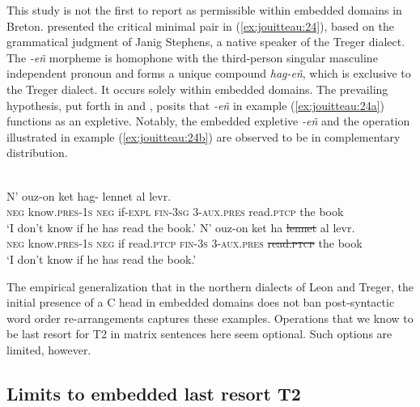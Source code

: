 \documentclass[output=paper,colorlinks,citecolor=brown]{langscibook}
\begin{document}
This study is not the first to report  as permissible within embedded domains in Breton. \citet{mj:Rivero1999} presented the critical minimal pair in (\ref{ex:jouitteau:24}), based on the grammatical judgment of Janig Stephens, a native speaker of the Treger dialect. The \textit{-eñ} morpheme is homophone with the third-person singular masculine independent pronoun and forms a unique compound \textit{hag-eñ}, which is exclusive to the Treger dialect. It occurs solely within embedded domains. The prevailing hypothesis, put forth in \citet[318]{mj:Lambert1998} and \citet[81--82]{mj:Rivero1999}, posits that \textit{-eñ} in example (\ref{ex:jouitteau:24a}) functions as an expletive. Notably, the embedded expletive \textit{-eñ} and the  operation illustrated in example (\ref{ex:jouitteau:24b}) are observed to be in complementary distribution. 


\ea \label{ex:jouitteau:24} \\
\ea \label{ex:jouitteau:24a}
    \gll  N'   ouz-on              ket  hag-  {}        {}         lennet     al   levr.  \\
     \textsc{neg} know\textsc{.pres}{}-\textsc{1s} \textsc{neg} if-\textsc{expl}   \textsc{fin}{}-\textsc{3sg} 3\textsc{{}-aux.pres} read\textsc{.ptcp} the book      \\
    \glt ‘I don't know if he has read the book.’
    \ex \label{ex:jouitteau:24b}
    \gll N'   ouz-on              ket   ha        {}   {}             \sout{lennet}         al   levr. \\
    \textsc{neg} know\textsc{.pres}{}-\textsc{1s} \textsc{neg}  if    read\textsc{.ptcp} \textsc{fin}{}-\textsc{3s} 3\textsc{{}-aux.pres} \sout{read\textsc{.ptcp}}  the book   \\
    \glt ‘I don't know if he has read the book.’
    \z
    \z 

The empirical generalization that in the northern dialects of Leon and Treger, the initial presence of a C head in embedded domains does not ban post-syntactic word order re-arrangements captures these examples. Operations that we know to be last resort for T2 in matrix sentences here seem optional. Such options are limited, however.

\subsection{Limits to embedded last resort T2}
\end{document}
